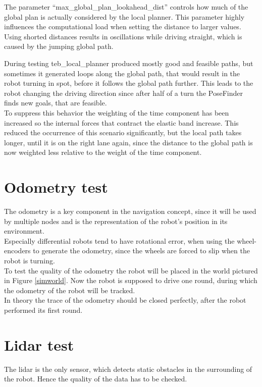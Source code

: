 The parameter ``max\_global\_plan\_lookahead\_dist'' controls how much of the global plan is actually considered by the local planner. This parameter highly influences the computational load when setting the distance to larger values. Using shorted distances results in oscillations while driving straight, which is caused by the jumping global path.

During testing teb\_local\_planner produced mostly good and feasible paths, but sometimes it generated loops along the global path, that would result in the robot turning in spot, before it follows the global path further. This leads to the robot changing the driving direction since after half of a turn the PoseFinder finds new goals, that are feasible.\\

To suppress this behavior the weighting of the time component has been increased so the internal forces that contract the elastic band increase. This reduced the occurrence of this scenario significantly, but the local path takes longer, until it is on the right lane again, since the distance to the global path is now weighted less relative to the weight of the time component.

\section{Odometry test}
The odometry is a key component in the navigation concept, since it will be used by multiple nodes and is the representation of the robot's position in its environment.\\

Especially differential robots tend to have rotational error, when using the wheel-encoders to generate the odometry, since the wheels are forced to slip when the robot is turning.\\

To test the quality of the odometry the robot will be placed in the world pictured in Figure \ref{simworld}. Now the robot is supposed to drive one round, during which the odometry of the robot will be tracked.\\

In theory the trace of the odometry should be closed perfectly, after the robot performed its first round.\\

\section{Lidar test}
The lidar is the only sensor, which detects static obstacles in the surrounding of the robot. Hence the quality of the data has to be checked.

